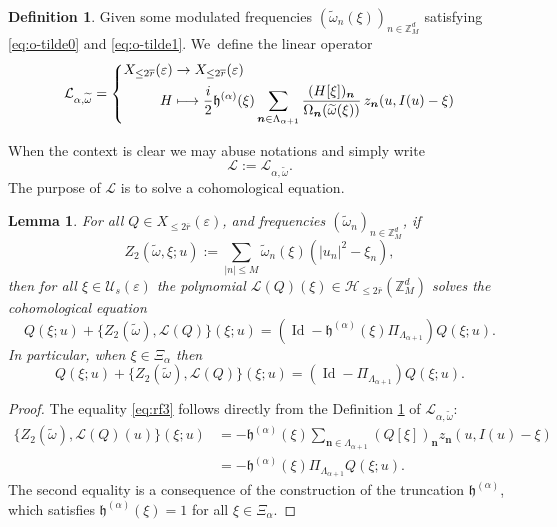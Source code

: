 \documentclass[JEP,XML,SOM,Unicode,published]{cedram}
\newcommand\mto{\mathchoice{\longmapsto}{\mapsto}{\mapsto}{\mapsto}}
\theoremstyle{plain}
\newtheorem{lemma}[theorem]{Lemma}
\theoremstyle{definition}
\newtheorem{definition}[theorem]{Definition}
\DeclareMathOperator{\Id}{Id}
\newcommand{\nb}{{\boldsymbol n}}
\newcommand{\Z}{\mathbb{Z}}
\newcommand{\1}{\mathbf{1}}
\let\epsilon\varepsilon
\begin{document}
\begin{definition}
\label{def:Lie}
Given some modulated frequencies $(\widetilde{\omega}_{n}(\xi))_{n\in\Z_{M}^{d}}$ satisfying \eqref{eq:o-tilde0} and \eqref{eq:o-tilde1}. We~define the linear operator
\begin{equation}
\label{eq:op}
\mathcal{L}_{\alpha,\widetilde{\omega}} = \left\{
\begin{aligned}
X_{\leq2\overline{r}}(\epsilon) & \to X_{\leq2\overline{r}}(\epsilon) \\
H & \mto \frac{i}{2}\mathfrak{h}^{(\alpha)}(\xi)
\sum_{\nb\in\Lambda_{\alpha+1}}
\frac{(H[\xi])_{\nb}}{\Omega_{\nb}(\widetilde{\omega}(\xi))}\,
z_{\nb}(u,I(u)-\xi)
\end{aligned}
\right.
\end{equation}
\end{definition}
When the context is clear we may abuse notations and simply write
\[
\mathcal{L} := \mathcal{L}_{\alpha,\widetilde{\omega}}.
\]
The purpose of $\mathcal{L}$ is to solve a cohomological equation.
\begin{lemma}
\label{lem:24}
For all $Q\in X_{\leq2\overline{r}}(\epsilon)$, and frequencies $(\widetilde{\omega}_{n})_{n\in\Z_{M}^{d}}$, if
\[
Z_{2}(\widetilde{\omega},\xi;u)
:= \sum_{|n|\leq M} \widetilde{\omega}_{n}(\xi)(|u_n|^{2}-\xi_{n}),
\]
then for all $\xi\in\mathcal{U}_{s}(\epsilon)$ the polynomial $\mathcal{L}(Q)(\xi)\in \mathcal{H}_{\leq2\overline{r}}(\Z_{M}^{d})$ solves the cohomological equation
\begin{equation}
\label{eq:rf3}
Q(\xi;u) + \{Z_{2}(\widetilde{\omega}),\mathcal{L}(Q)\}(\xi;u) = (\Id-\mathfrak{h}^{(\alpha)}(\xi)\Pi_{\Lambda_{\alpha+1}})Q(\xi;u).
\end{equation}
In particular, when $\xi\in\Xi_{\alpha}$ then
\[
Q(\xi;u) + \{Z_{2}(\widetilde{\omega}),\mathcal{L}(Q)\}(\xi;u) = (\Id-\Pi_{\Lambda_{\alpha+1}})Q(\xi;u).
\]
\end{lemma}
\begin{proof}
The equality \eqref{eq:rf3} follows directly from the Definition \ref{def:Lie} of $\mathcal{L}_{\alpha,\widetilde{\omega}}$:
\begin{equation}
\begin{split}
\label{eq:rf2}
\{Z_{2}(\widetilde{\omega}),\mathcal{L}(Q)(u)\}(\xi;u)& = - \mathfrak{h}^{(\alpha)}(\xi)\sum_{\nb\in\Lambda_{\alpha+1}}(Q[\xi])_{\nb}z_{\nb}(u,I(u)-\xi)\\& = - \mathfrak{h}^{(\alpha)}(\xi)\Pi_{\Lambda_{\alpha+1}}Q(\xi;u).
\end{split}
\end{equation}
The second equality is a consequence of the construction of the truncation $\mathfrak{h}^{(\alpha)}$, which satisfies $\mathfrak{h}^{(\alpha)}(\xi)=1$ for all $\xi\in\Xi_{\alpha}$.
\end{proof}
\end{document}
